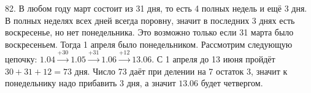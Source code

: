 82. В любом году март состоит из 31 дня, то есть 4 полных недель и ещё 3 дня. В полных неделях всех дней всегда поровну, значит в последних 3 днях есть воскресенье, но нет понедельника. Это возможно только если 31 марта было воскресеньем. Тогда 1 апреля было понедельником. Рассмотрим следующую цепочку:
$1.04\stackrel{+30}{\rightarrow}1.05\stackrel{+31}{\rightarrow}1.06\stackrel{+12}{\rightarrow}13.06.$ С 1 апреля до 13 июня пройдёт $30+31+12=73$ дня. Число 73 даёт при делении на 7 остаток 3, значит к понедельнику надо прибавить 3 дня, а значит $13.06$ будет четвергом.\\
